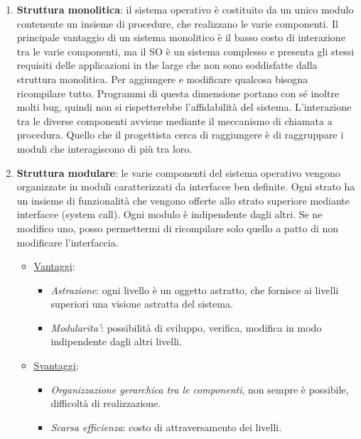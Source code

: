 \documentclass{article}
\begin{document}
\begin{enumerate}
    \item \textbf{Struttura monolitica}: il sistema operativo è costituito da un unico modulo 
    contenente un insieme di procedure, che realizzano le varie componenti.
    Il principale vantaggio di un sistema monolitico è il basso costo di interazione tra le
    varie componenti, ma il SO è un sistema complesso e presenta gli stessi requisiti delle 
    applicazioni in the large che non sono soddisfatte dalla struttura monolitica.  
    Per aggiungere e modificare qualcosa bisogna ricompilare tutto. Programmi di questa 
    dimensione portano con sé inoltre molti bug, quindi non si rispetterebbe l'affidabilità
    del sistema. L'interazione tra le diverse componenti avviene mediante il meccanismo di 
    chiamata a procedura. Quello che il progettista cerca di raggiungere è di raggruppare i
    moduli che interagiscono di più tra loro.
    
    \item \textbf{Struttura modulare}: le varie componenti del sistema operativo vengono 
    organizzate in moduli caratterizzati da interfacce ben definite. Ogni strato ha un
     insieme di funzionalità che vengono offerte allo strato superiore mediante interfacce (system call).
    Ogni modulo è indipendente dagli altri. Se ne modifico uno, posso permettermi di 
    ricompilare solo quello a patto di non modificare l'interfaccia.
    \begin{itemize}
        \item \underline{Vantaggi}:\begin{itemize}
            \item \textit{Astrazione}: ogni livello è un oggetto astratto, che fornisce ai
             livelli superiori una visione astratta del sistema.
            \item \textit{Modularita'}: possibilità di sviluppo, verifica,
            modifica in modo indipendente dagli altri livelli.
        \end{itemize}
        \item \underline{Svantaggi}:\begin{itemize}
            \item \textit{Organizzazione gerarchica tra le componenti}, non sempre è possibile,
            difficoltà di realizzazione.
            \item \textit{Scarsa efficienza}: costo di attraversamento dei livelli.
        \end{itemize}
    \end{itemize}
    

\end{enumerate}
\end{document}
